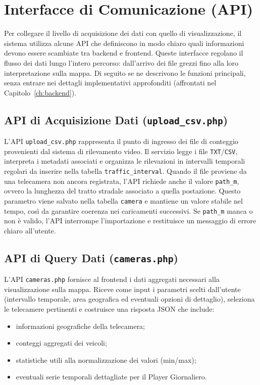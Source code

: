 \documentclass[12pt, oneside]{extbook}
\begin{document}
\section{Interfacce di Comunicazione (API)}

Per collegare il livello di acquisizione dei dati con quello di visualizzazione,
il sistema utilizza alcune API che definiscono in modo chiaro quali informazioni
devono essere scambiate tra backend e frontend. Queste interfacce regolano il
flusso dei dati lungo l’intero percorso: dall’arrivo dei file grezzi fino alla loro
interpretazione sulla mappa. Di seguito se ne descrivono le funzioni principali,
senza entrare nei dettagli implementativi approfonditi (affrontati nel
Capitolo~\ref{ch:backend}).

\subsection{API di Acquisizione Dati (\texttt{upload\_csv.php})}

L’API \texttt{upload\_csv.php} rappresenta il punto di ingresso dei file
di conteggio provenienti dal sistema di rilevamento video. Il servizio legge i
file \texttt{TXT}/\texttt{CSV}, interpreta i metadati associati e organizza le
rilevazioni in intervalli temporali regolari da inserire nella tabella
\texttt{traffic\_interval}. Quando il file proviene da una telecamera non ancora registrata, l’API richiede
anche il valore \texttt{path\_m}, ovvero la lunghezza del tratto stradale associato a
quella postazione. Questo parametro viene salvato nella tabella \texttt{camera} e
mantiene un valore stabile nel tempo, così da garantire coerenza nei caricamenti
successivi. Se \texttt{path\_m} manca o non è valido, l’API interrompe
l’importazione e restituisce un messaggio di errore chiaro all’utente.

\subsection{API di Query Dati (\texttt{cameras.php})}

L’API \texttt{cameras.php} fornisce al frontend i dati aggregati necessari alla
visualizzazione sulla mappa. Riceve come input i parametri scelti dall’utente
(intervallo temporale, area geografica ed eventuali opzioni di dettaglio),
seleziona le telecamere pertinenti e costruisce una risposta JSON che include:

\begin{itemize}
  \item informazioni geografiche della telecamera;
  \item conteggi aggregati dei veicoli;
  \item statistiche utili alla normalizzazione dei valori (min/max);
  \item eventuali serie temporali dettagliate per il Player Giornaliero.
\end{itemize}
\end{document}
